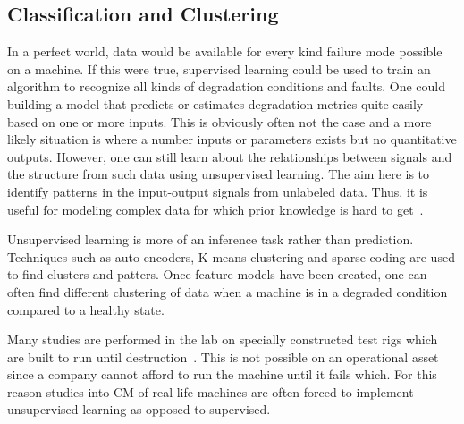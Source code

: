 \documentclass[]{article}
\begin{document}
\subsection{Classification and Clustering}
In a perfect world, data would be available for every kind failure mode possible on a machine. If this were true, supervised learning could be used to train an algorithm to recognize all kinds of degradation conditions and faults. One could building a model that predicts or estimates degradation metrics quite easily based on one or more inputs. This is obviously often not the case and a more likely situation is where a number inputs or parameters exists but no quantitative outputs. However, one can still learn about the relationships between signals and the structure from such data using unsupervised learning. The aim here is to identify patterns in the input-output signals from unlabeled data. Thus, it is useful for modeling complex data for which prior knowledge is hard to get~\cite{martin2017unsupervised}.

Unsupervised learning is more of an inference task rather than prediction. Techniques such as auto-encoders, K-means clustering and sparse coding are used to find clusters and patters. Once feature models have been created, one can often find different clustering of data when a machine is in a degraded condition compared to a healthy state.

Many studies are performed in the lab on specially constructed test rigs which are built to run until destruction~\cite{soualhi2021novel, wang2016multiple, d2019physical, malhi2004pca}. This is not possible on an operational asset since a company cannot afford to run the machine until it fails which. For this reason studies into \gls{CM} of real life machines are often forced to implement unsupervised learning as opposed to supervised.
\end{document}
